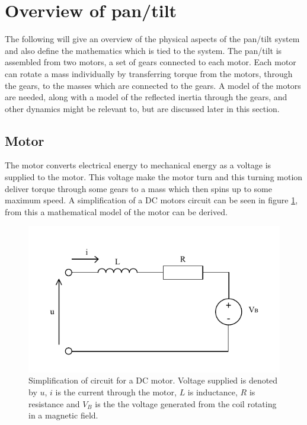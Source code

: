 \section{Overview of pan/tilt}
The following will give an overview of the physical aspects of the pan/tilt system and also define the mathematics which is tied to the system. The pan/tilt is assembled from two motors, a set of gears connected to each motor. Each motor can rotate a mass individually by transferring torque from the motors, through the gears, to the masses which are connected to the gears. A model of the motors are needed, along with a model of the reflected inertia through the gears, and other dynamics might be relevant to, but are discussed later in this section.

\subsection{Motor}
The motor converts electrical energy to mechanical energy as a voltage is supplied to the motor. This voltage make the motor turn and this turning motion deliver torque through some gears to a mass which then spins up to some maximum speed. A simplification of a DC motors circuit can be seen in figure \ref{fig:motor_circuit}, from this a mathematical model of the motor can be derived.
\begin{figure}[htb]
	\begin{center}
	\includegraphics[scale=1,trim=0 0 0 0]{graphics/motor_circuit.pdf} %
	\caption{Simplification of circuit for a DC motor. Voltage supplied is denoted by $u$, $i$ is the current through the motor, $L$ is inductance, $R$ is resistance and $V_B$ is the the voltage generated from the coil rotating in a magnetic field.}
	\label{fig:motor_circuit}			%
	\end{center}
\end{figure}

